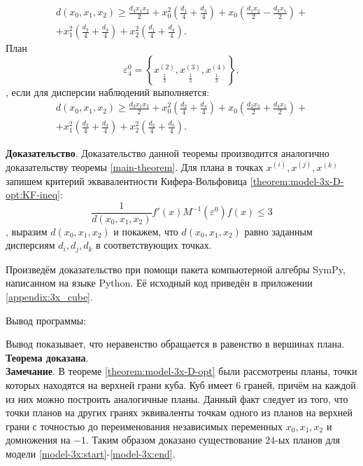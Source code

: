 \begin{theorem}
	\begin{multline}\label{theorem:model-3x-D-opt:plan-3-d}
	d(x_0, x_1, x_2) \ge \frac{d_{4} x_{1} x_{2}}{2} + x_{0}^{2} \left(\frac{d_{1}}{4} + \frac{d_{3}}{4}\right) + x_{0} \left(\frac{d_{1} x_{2}}{2} - \frac{d_{3} x_{1}}{2}\right) + \\ + x_{1}^{2} \left(\frac{d_{3}}{4} + \frac{d_{4}}{4}\right) + x_{2}^{2} \left(\frac{d_{1}}{4} + \frac{d_{4}}{4}\right).
	\end{multline}
	План 
	\begin{equation} \label{theorem:model-3x-D-opt:plan-4}
	\varepsilon_4^{0} = \left \{ 
	\underset{\frac 1 3} {x^{(2)}},
	\underset{\frac 1 3} {x^{(3)}},
	\underset{\frac 1 3} {x^{(4)}}
	\right \},
	\end{equation},
	если для дисперсии наблюдений выполняется:
	\begin{multline}\label{theorem:model-3x-D-opt:plan-4-d}
	d(x_0, x_1, x_2) \ge \frac{d_{3} x_{1} x_{2}}{2} + x_{0}^{2} \left(\frac{d_{2}}{4} + \frac{d_{4}}{4}\right) + x_{0} \left(\frac{d_{2} x_{2}}{2} + \frac{d_{4} x_{1}}{2}\right) + \\ + x_{1}^{2} \left(\frac{d_{3}}{4} + \frac{d_{4}}{4}\right) + x_{2}^{2} \left(\frac{d_{2}}{4} + \frac{d_{3}}{4}\right).
	\end{multline}		
\end{theorem}

\textbf{Доказательство}. Доказательство данной теоремы производится аналогично доказательству теоремы \ref{main-theorem}. Для плана в точках $x^{(i)}, x^{(j)}, x^{(k)}$ запишем критерий эквавалентности Кифера-Вольфовица \eqref{theorem:model-3x-D-opt:KF-ineq}:
\begin{equation}\label{theorem:model-3x-D-opt:KF-ineq}
\frac{1}{d(x_0, x_1, x_2)} f'(x) M^{-1}(\varepsilon^0) f(x) \le 3
\end{equation},
выразим $d(x_0, x_1, x_2)$ и покажем, что $d(x_0, x_1, x_2)$ равно заданным дисперсиям $d_i, d_j, d_k$ в соответствующих точках.

Произведём доказательство при помощи пакета компьютерной алгебры SymPy, написанном на языке Python. Её исходный код приведён в приложении \ref{appendix:3x_cube}.

Вывод программы:

Вывод показывает, что неравенство обращается в равенство в вершинах плана. \textbf{Теорема доказана}.\\

\textbf{Замечание}.
В теореме \ref{theorem:model-3x-D-opt} были рассмотрены планы, точки которых находятся на верхней грани куба. Куб имеет 6 граней, причём на каждой из них можно построить аналогичные планы. Данный факт следует из того, что точки планов на других гранях эквиваленты точкам одного из планов на верхней грани с точностью до переименования независимых переменных $x_0, x_1, x_2$ и домножения на $-1$. Таким образом доказано существование $24$-ых планов для модели \eqref{model-3x:start}-\eqref{model-3x:end}.	

